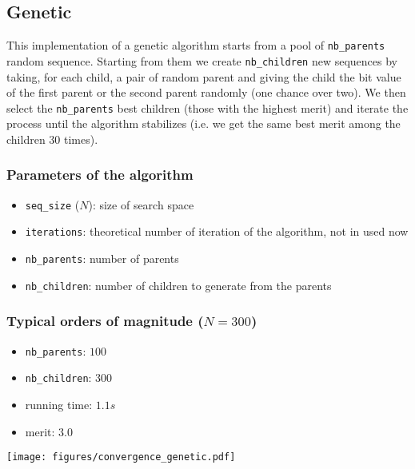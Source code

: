 \documentclass{article}
\begin{document}
\subsection{Genetic}

  This implementation of a genetic algorithm starts from a pool of
  \texttt{nb\_parents} random sequence. Starting from them we create
  \texttt{nb\_children} new sequences by taking, for each child, a pair of
  random parent and giving the child the bit value of the first parent or the
  second parent randomly (one chance over two). We then select the
  \texttt{nb\_parents} best children (those with the highest merit) and iterate
  the process until the algorithm stabilizes (i.e. we get the same best merit
  among the children 30 times).

  \begin{multicols}{2}
    \subsubsection*{Parameters of the algorithm}
      \begin{itemize}
        \item \texttt{seq\_size} ($N$): size of search space
        \item \texttt{iterations}: theoretical number of iteration of the
          algorithm, not in used now
        \item \texttt{nb\_parents}: number of parents
        \item \texttt{nb\_children}: number of children to generate from the
          parents
      \end{itemize}

    \subsubsection*{Typical orders of magnitude ($N = 300$)}
      \begin{itemize}
        \item \texttt{nb\_parents}: $100$
        \item \texttt{nb\_children}: $300$
        \item running time: $1.1s$
        \item merit: $3.0$
      \end{itemize}

    \vphantom{0}

  \columnbreak

    \texttt{[image: figures/convergence\_genetic.pdf]}

  \end{multicols}
\end{document}
